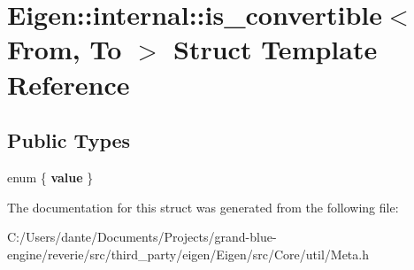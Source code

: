 \hypertarget{struct_eigen_1_1internal_1_1is__convertible}{}\section{Eigen\+::internal\+::is\+\_\+convertible$<$ From, To $>$ Struct Template Reference}
\label{struct_eigen_1_1internal_1_1is__convertible}
\subsection*{Public Types}
\begin{DoxyCompactItemize}
\item 
\mbox{\label{struct_eigen_1_1internal_1_1is__convertible_a13d4154052f756373560f11454dd505d}} 
enum \{ {\bfseries value}
 \}
\end{DoxyCompactItemize}


The documentation for this struct was generated from the following file\+:\begin{DoxyCompactItemize}
\item 
C\+:/\+Users/dante/\+Documents/\+Projects/grand-\/blue-\/engine/reverie/src/third\+\_\+party/eigen/\+Eigen/src/\+Core/util/Meta.\+h\end{DoxyCompactItemize}
